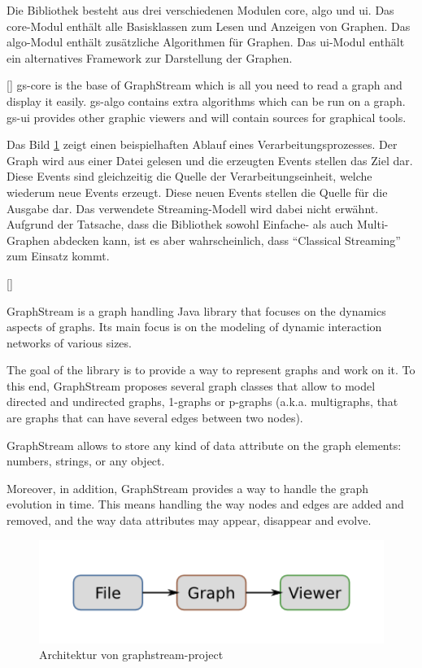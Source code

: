 Die Bibliothek besteht aus drei verschiedenen Modulen core, algo und ui. Das
core-Modul enthält alle Basisklassen zum Lesen und Anzeigen von Graphen. Das
algo-Modul enthält zusätzliche Algorithmen für Graphen. Das ui-Modul enthält ein
alternatives Framework zur Darstellung der Graphen.

[\cite{Team2018}]{
gs-core is the base of GraphStream which is all you need to read a graph and
display it easily. gs-algo contains extra algorithms which can be run on a graph.
gs-ui provides other graphic viewers and will contain sources for graphical tools.
}

Das Bild \ref{fig:graphstream-project-architecture} zeigt einen beispielhaften
Ablauf eines Verarbeitungsprozesses. Der Graph wird aus einer Datei gelesen und
die erzeugten Events stellen das Ziel dar. Diese Events sind gleichzeitig die
Quelle der Verarbeitungseinheit, welche wiederum neue Events erzeugt. Diese neuen
Events stellen die Quelle für die Ausgabe dar. Das verwendete Streaming-Modell
wird dabei nicht erwähnt. Aufgrund der Tatsache, dass die Bibliothek sowohl
Einfache- als auch Multi-Graphen abdecken kann, ist es aber wahrscheinlich, dass
\enquote{Classical Streaming} zum Einsatz kommt.

[\cite{Team2018}]{
GraphStream is a graph handling Java library that focuses on the dynamics aspects
of graphs. Its main focus is on the modeling of dynamic interaction networks of
various sizes.

The goal of the library is to provide a way to represent graphs and work on it.
To this end, GraphStream proposes several graph classes that allow to model
directed and undirected graphs, 1-graphs or p-graphs (a.k.a. multigraphs, that
are graphs that can have several edges between two nodes).

GraphStream allows to store any kind of data attribute on the graph elements:
numbers, strings, or any object.

Moreover, in addition, GraphStream provides a way to handle the graph evolution
in time. This means handling the way nodes and edges are added and removed, and
the way data attributes may appear, disappear and evolve.
}

\begin{figure}
\centering
\includegraphics[width=15cm]{../material/images/graphpipeline-graphstream.png}
\caption{Architektur von graphstream-project \cite{Team2018}}
\label{fig:graphstream-project-architecture}
\end{figure}

